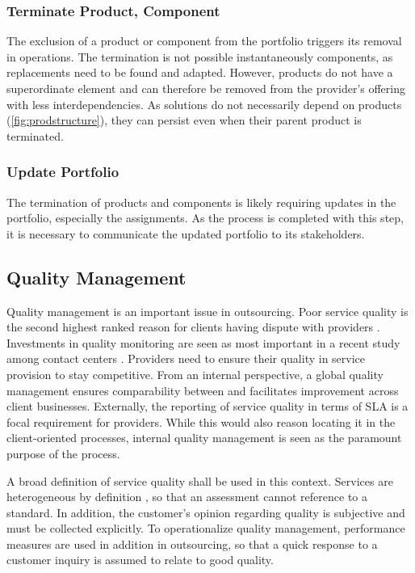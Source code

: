 	\subsubsection{Terminate Product, Component}
	The exclusion of a product or component from the portfolio triggers its removal in operations. The termination is not  possible instantaneously \wrt components, as replacements need to be found and adapted. However, products do not have a superordinate element and can therefore be removed from the provider's offering with less interdependencies. As solutions do not necessarily depend on products (\cf \Fig \ref{fig:prodstructure}), they can persist even when their parent product is terminated. 
	
	
	\subsubsection{Update Portfolio}
	The termination of products and components is likely requiring updates in the portfolio, especially \wrt the assignments. As the process is completed with this step, it is necessary to communicate the updated portfolio to its stakeholders. 
	
	\subsection{Quality Management}
	\label{sec:qualmang}
	
	Quality management is an important issue in outsourcing. Poor service quality is the second highest ranked reason for clients having dispute with providers \citep{deloitte2014outsourcing}. Investments in quality monitoring are seen as most important in a recent study among contact centers \citep{ccnet2016}. Providers need to ensure their quality in service provision to stay competitive. From an internal perspective, a global quality management ensures comparability between and facilitates improvement across client businesses. Externally, the reporting of service quality in terms of \acrshort{SLA} is a focal requirement for providers. While this would also reason locating it in the client-oriented processes, internal quality management is seen as the paramount purpose of the process. 
	
	A broad definition of service quality shall be used in this context. Services are heterogeneous by definition \citep{cowell1988new}, so that an assessment cannot reference to a standard. In addition, the customer's opinion regarding quality is subjective and must be collected explicitly. To operationalize quality management, performance measures are used in addition in outsourcing, so that a quick response to a customer inquiry is assumed to relate to good quality.
	
